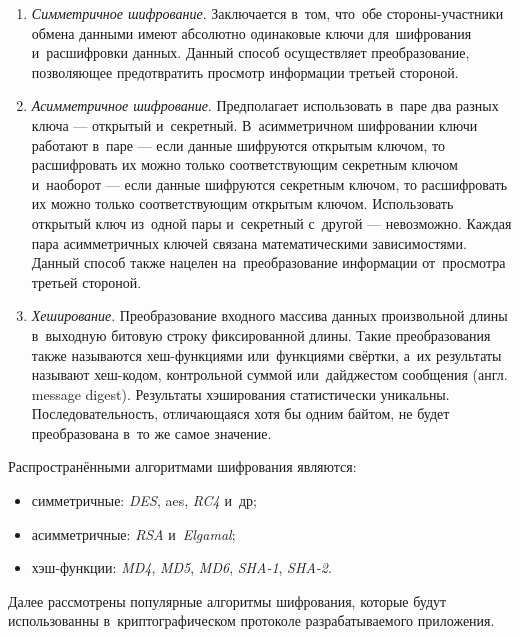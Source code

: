 \begin{enumerate}
	\item \emph{Симметричное шифрование}. Заключается в~том, что~обе стороны-участники обмена данными имеют абсолютно одинаковые ключи для~шифрования и~расшифровки данных. Данный способ осуществляет преобразование, позволяющее предотвратить просмотр информации третьей стороной.
	\item \emph{Асимметричное шифрование}. Предполагает использовать в~паре два разных ключа — открытый и~секретный. В~асимметричном шифровании ключи работают в~паре — если данные шифруются открытым ключом, то расшифровать их можно только соответствующим секретным ключом и~наоборот — если данные шифруются секретным ключом, то расшифровать их можно только соответствующим открытым ключом. Использовать открытый ключ из~одной пары и~секретный с~другой — невозможно. Каждая пара асимметричных ключей связана математическими зависимостями. Данный способ также нацелен на~преобразование информации от~просмотра третьей стороной.
	\item \emph{Хеширование}. Преобразование входного массива данных произвольной длины в~выходную битовую строку фиксированной длины. Такие преобразования также называются хеш-функциями или~функциями свёртки, а~их результаты называют хеш-кодом, контрольной суммой или~дайджестом сообщения (англ. message digest). Результаты хэширования статистически уникальны. Последовательность, отличающаяся хотя бы одним байтом, не будет преобразована в~то же самое значение.
\end{enumerate}

Распространёнными алгоритмами шифрования являются:

\begin{itemize}
	\item симметричные: \textit{DES}, \gls{aes}, \textit{RC4} и~др;
	\item асимметричные: \textit{RSA} и~\textit{Elgamal};
	\item хэш-функции: \textit{MD4}, \textit{MD5}, \textit{MD6}, \textit{SHA-1}, \textit{SHA-2}.
\end{itemize}

Далее рассмотрены популярные алгоритмы шифрования, которые будут использованны в~криптографическом протоколе разрабатываемого приложения.